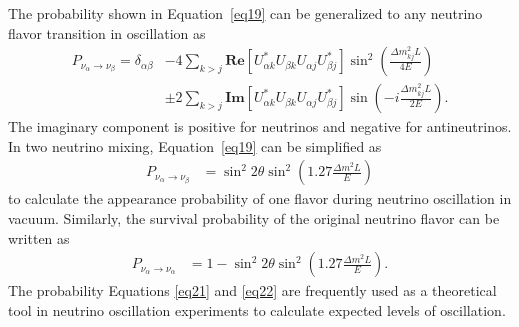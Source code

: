     The probability shown in Equation~\ref{eq19} can be generalized to any neutrino flavor transition in oscillation as
\begin{equation}\label{eq20}
\begin{aligned}
    P_{\nu_\alpha\rightarrow\nu_\beta} = \delta_{\alpha\beta} & -  4 \sum\limits_{k>j}\textbf{Re} \left[ U^*_{\alpha k} U_{\beta k} U_{\alpha j} U^*_{\beta j}\right]\sin^2\left(\frac{\Delta m^2_{kj}L}{4E}\right) \\
     & \pm 2 \sum\limits_{k>j} \textbf{Im} \left[
     U^*_{\alpha k} U_{\beta k} U_{\alpha j} U^*_{\beta j}\right]\sin\left(-i\frac{\Delta m^2_{kj}L}{2E}\right).
\end{aligned}
\end{equation}
    The imaginary component is positive for neutrinos and negative for antineutrinos. 
    In two neutrino mixing, Equation~\ref{eq19} can be simplified as
    \begin{equation}\label{eq21}
    \begin{aligned}
    P_{\nu_\alpha\rightarrow\nu_\beta} & = \sin^2{2\theta}\sin^2\left( 1.27\frac{\Delta m^2L}{E} \right)
    \end{aligned}
    \end{equation}
    to calculate the appearance probability of one flavor during neutrino oscillation in vacuum.
    Similarly, the survival probability of the original neutrino flavor can be written as 
    \begin{equation}\label{eq22}
    \begin{aligned}
    P_{\nu_\alpha\rightarrow\nu_\alpha} & = 1- \sin^2{2\theta}\sin^2\left( 1.27\frac{\Delta m^2L}{E} \right).
    \end{aligned}
    \end{equation}
    The probability Equations \ref{eq21} and \ref{eq22} are frequently used as a theoretical tool in neutrino oscillation experiments to calculate expected levels of oscillation.

    
